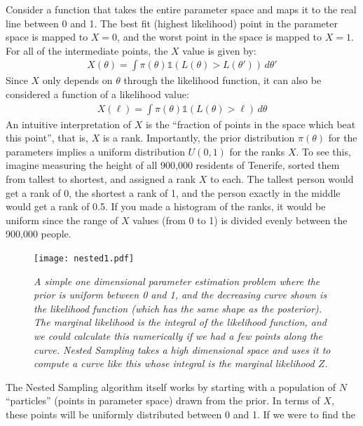 Consider a function that takes the entire parameter space and maps it to the
real line between 0 and 1. The best fit (highest likelihood) point in the
parameter space is mapped to $X=0$,
and the worst point in the space is mapped to $X=1$.
For all of the intermediate points, the $X$ value is given by:
\begin{eqnarray}
X(\theta) = \int \pi(\theta) \mathds{1}\left(L(\theta) > L(\theta')\right)\, d\theta'
\end{eqnarray}
Since $X$ only depends on $\theta$ through the likelihood function,
it can also be considered a function of a likelihood value:
\begin{eqnarray}
X(\ell) = \int \pi(\theta) \mathds{1}\left(L(\theta) > \ell\right)\, d\theta
\end{eqnarray}
An intuitive interpretation of $X$ is the ``fraction of points in the space
which beat this point'', that is, $X$ is a rank. Importantly, the prior
distribution $\pi(\theta)$ for the parameters implies a uniform distribution
$U(0, 1)$ for the ranks $X$. To see this, imagine measuring the height of all
900,000 residents of Tenerife, sorted them from tallest to shortest,
and assigned a rank $X$ to each. The tallest
person would get a rank of 0, the shortest a rank of 1, and the person exactly
in the middle would get a rank of 0.5. If you made a histogram of the ranks, it
would be uniform since the range of $X$ values (from 0 to 1) is divided evenly between the 900,000 people.

\begin{figure}
\begin{center}
\texttt{[image: nested1.pdf]}
\caption{\it A simple one dimensional parameter estimation problem where the
prior is uniform between 0 and 1, and the decreasing curve shown is the likelihood
function (which has the same shape as the posterior). The marginal likelihood
is the integral of the likelihood function, and we could calculate this
numerically if we had a few points along the curve. Nested Sampling takes a
high dimensional space and uses it to compute a curve like this whose integral
is the marginal likelihood $Z$.
\label{fig:nested1}}
\end{center}
\end{figure}

The Nested Sampling algorithm itself works by starting with a population
of $N$ ``particles'' (points in parameter space) drawn from the prior. In
terms of $X$, these points will be uniformly distributed between 0 and 1.
If we were to find the 

